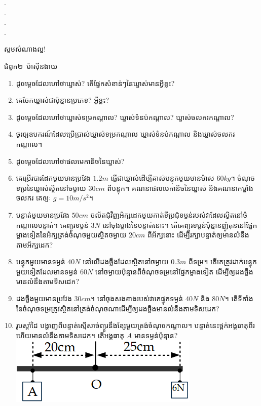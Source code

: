 \documentclass{officialexam}
\begin{document}
	{\color{white}.}\dotfill\\
	{\color{white}.}\dotfill
	\\
	{\color{white}.}\dotfill\\
	{\color{white}.}\dotfill
	\begin{center}
		\sffamily\color{blue}
		សូមសំណាងល្អ!
	\end{center}\newpage
\begin{center}
	\sffamily\color{blue}
	\huge ជំពូក២~\color{red}ម៉ាសុីនងាយ
\end{center}
\begin{enumerate}[m]
	\item ដូចម្តេចដែលហៅថាឃ្នាស់? តើផ្នែកសំខាន់ៗនៃឃ្នាស់មានអ្វីខ្លះ?
	\item គេចែកឃ្នាស់ជាប៉ុន្មានប្រភេទ? អ្វីខ្លះ?
	\item ដូចម្តេចដែលហៅថាឃ្នាស់ទម្រកណ្តាល? ឃ្នាស់ទំនប់កណ្តាល? ឃ្នាស់ចលករកណ្តាល?
	\item ចូរឲ្យឧបករណ៍ដែលប្រើប្រាស់ឃ្នាស់ទម្រកណ្តាល ឃ្នាស់ទំនប់កណ្តាល និងឃ្នាស់ចលករកណ្តាល។
	\item ដូចម្តេចដែលហៅថាផលមេកានិចនៃឃ្នាស់?
	\item គេប្រើរបារដែកមួយមានប្រវែង $1.2m$ ធ្វើជាឃ្នាស់ដើម្បីគាស់បន្ទុកមួយមានម៉ាស $60kg$។ ចំណុចទម្រនៃឃ្នាស់ស្ថិតនៅចម្ងាយ $30cm$ ពីបន្ទុក។ គណនាផលមេកានិចនៃឃ្នាស់ និងគណនាកម្លាំងចលករ គេឲ្យៈ $g=10m/s^{2}$។
	\item បន្ទាត់មួយមានប្រវែង $50cm$ ចល័តជុំវិញអ័ក្សដេកមួយកាត់ទីប្រជុំទម្ងន់របស់វាដែលស្ថិតនៅចំកណ្តាលបន្ទាត់។ គេព្យួរទម្ងន់ $3N$ នៅចុងម្ខាងនៃបន្ទាត់នោះ។ តើគេព្យួរទម្ងន់ប៉ុន្មានញ៉ូតុននៅផ្នែកម្ខាងទៀតនៃអ័ក្សត្រង់ចំណុចមួយស្ថិតចម្ងាយ $20cm$ ពីអ័ក្សនោះ ដើម្បីរក្សាបន្ទាត់ឲ្យមានលំនឹងតាមអ័ក្សដេក?
	\item បន្ទុកមួយមានទម្ងន់ $40N$ នៅលើដងថ្លឹងដែលស្ថិតនៅចម្ងាយ $0.3m$ ពីទម្រ។ តើគេត្រូវដាក់បន្ទុកមួយទៀតដែលមានទម្ងន់ $60N$ នៅចម្ងាយប៉ុន្មានពីចំណុចទម្រនៅផ្នែកម្ខាងទៀត ដើម្បីឲ្យដងថ្លឹងមានលំនឹងតាមទិសដេក?
	\item ដងថ្លឹងមួយមានប្រវែង $30cm$។ នៅចុងសងខាងរបស់វាគេផ្ទុកទម្ងន់ $40N$ និង $80N$។ តើទីតាំងនៃចំណុចទម្រត្រូវស្ថិតនៅត្រង់ចំណុចណាដើម្បីឲ្យដងថ្លឹងមានលំនឹងតាមទិសដេក?
	\item \begin{multicols}{2}
		រូបស្តាំដៃ បង្ហាញពីបន្ទាត់ស្មើសាច់ព្យួរនឹងខ្សែមួយត្រង់ចំណុចកណ្តាល។ បន្ទាត់នេះថ្ពក់អង្គធាតុពីរហើយមានលំនឹងតាមទិសដេក។ តើអង្គធាតុ $A$ មានទម្ងន់ប៉ុន្មាន?
		\includegraphics[scale=0.7]{13}

\end{multicols}
\end{enumerate}
\end{document}
